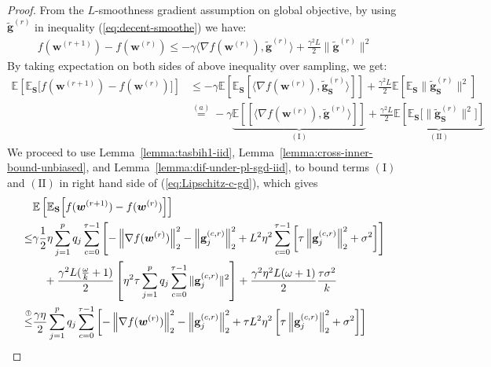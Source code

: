 \documentclass{article}
\begin{document}
\begin{proof}
From the $L$-smoothness gradient assumption on global objective, by using  $\tilde{\mathbf{g}}^{(r)}$ in inequality (\ref{eq:decent-smoothe}) we have:
\begin{align}
    f({\boldsymbol{w}}^{(r+1)})-f({\boldsymbol{w}}^{(r)})\leq -\gamma \big\langle\nabla f({\boldsymbol{w}}^{(r)}),\tilde{\mathbf{g}}^{(r)}\big\rangle+\frac{\gamma^2 L}{2}\|\tilde{\mathbf{g}}^{(r)}\|^2\label{eq:Lipschitz-c1}
\end{align}
By taking expectation on both sides of above inequality over sampling, we get:
\begin{align}
    \mathbb{E}\left[\mathbb{E}_\mathbf{S}\Big[f({\boldsymbol{w}}^{(r+1)})-f({\boldsymbol{w}}^{(r)})\Big]\right]&\leq -\gamma\mathbb{E}\left[\mathbb{E}_\mathbf{S}\left[ \big\langle\nabla f({\boldsymbol{w}}^{(r)}),\tilde{\mathbf{g}}_\mathbf{S}^{(r)}\big\rangle\right]\right]+\frac{\gamma^2 L}{2}\mathbb{E}\left[\mathbb{E}_\mathbf{S}\|\tilde{\mathbf{g}}_\mathbf{S}^{(r)}\|^2\right]\nonumber\\
    &\stackrel{(a)}{=}-\gamma\underbrace{\mathbb{E}\left[\left[ \big\langle\nabla f({\boldsymbol{w}}^{(r)}),\tilde{\mathbf{g}}^{(r)}\big\rangle\right]\right]}_{(\mathrm{I})}+\frac{\gamma^2 L}{2}\underbrace{\mathbb{E}\left[\mathbb{E}_\mathbf{S}\Big[\|\tilde{\mathbf{g}}_\mathbf{S}^{(r)}\|^2\Big]\right]}_{\mathrm{(II)}}\label{eq:Lipschitz-c-gd}
\end{align}
We proceed to use Lemma~\ref{lemma:tasbih1-iid}, Lemma~\ref{lemma:cross-inner-bound-unbiased}, and Lemma~\ref{lemma:dif-under-pl-sgd-iid}, to bound  terms $(\mathrm{I})$ and $(\mathrm{II})$ in right hand side of (\ref{eq:Lipschitz-c-gd}), which gives
\begin{align}
     &\mathbb{E}\left[\mathbb{E}_{\mathbf{S}}\Big[f({\boldsymbol{w}}^{(r+1)})-f({\boldsymbol{w}}^{(r)})\Big]\right]\nonumber\\
     \leq& \gamma\frac{1}{2}\eta\sum_{j=1}^pq_j\sum_{c=0}^{\tau-1}\left[-\left\|\nabla f({\boldsymbol{w}}^{(r)})\right\|_2^2-\left\|\mathbf{g}_j^{(c,r)}\right\|_2^2+L^2\eta^2\sum_{c=0}^{\tau-1}\left[\tau\left\|{\mathbf{g}}_j^{(c,r)}\right\|_2^2+\sigma^2\right]\right]\nonumber\\
     &\quad+\frac{\gamma^2 L(\frac{\omega}{k}+1)}{2}\left[{\eta^2\tau}\sum_{j=1}^pq_j\sum_{c=0}^{\tau-1}\|\mathbf{g}^{(c,r)}_{j}\|^2\right]+\frac{\gamma^2\eta^2 L(\omega+1)}{2}\frac{\tau \sigma^2}{k}\nonumber\\
     \stackrel{\text{\ding{192}}}{\leq}&\frac{\gamma\eta}{2}\sum_{j=1}^pq_j\sum_{c=0}^{\tau-1}\left[-\left\|\nabla f({\boldsymbol{w}}^{(r)})\right\|_2^2-\left\|\mathbf{g}_j^{(c,r)}\right\|_2^2+\tau L^2\eta^2\left[\tau\left\|{\mathbf{g}}_j^{(c,r)}\right\|_2^2+\sigma^2\right]\right]\nonumber\\

\end{align}
\end{proof}
\end{document}
